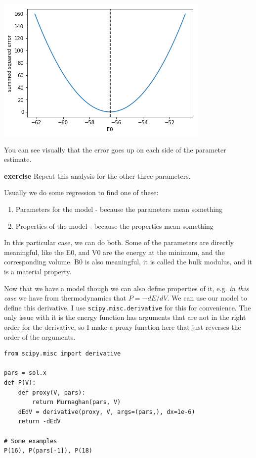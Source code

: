 \documentclass[11pt]{article}
\begin{document}
\begin{center}
\includegraphics[width=.9\linewidth]{obipy-resources/513154bd4a2746455cb8d249e9b62785-85168u3L.png}
\end{center}

You can see visually that the error goes up on each side of the parameter estimate.

\textbf{exercise} Repeat this analysis for the other three parameters.

Usually we do some regression to find one of these:
\begin{enumerate}
\item Parameters for the model - because the parameters mean something
\item Properties of the model - because the properties mean something
\end{enumerate}

In this particular case, we can do both. Some of the parameters are directly meaningful, like the E0, and V0 are the energy at the minimum, and the corresponding volume. B0 is also meaningful, it is called the bulk modulus, and it is a material property.

Now that we have a model though we can also define properties of it, e.g. \emph{in this case} we have from thermodynamics that \(P = -dE/dV\). We can use our model to define this derivative. I use \texttt{scipy.misc.derivative} for this for convenience. The only issue with it is the energy function has arguments that are not in the right order for the derivative, so I make a proxy function here that just reverses the order of the arguments.

\begin{verbatim}
from scipy.misc import derivative

pars = sol.x
def P(V):
    def proxy(V, pars):
        return Murnaghan(pars, V)
    dEdV = derivative(proxy, V, args=(pars,), dx=1e-6)
    return -dEdV

# Some examples
P(16), P(pars[-1]), P(18)
\end{verbatim}
\end{document}
